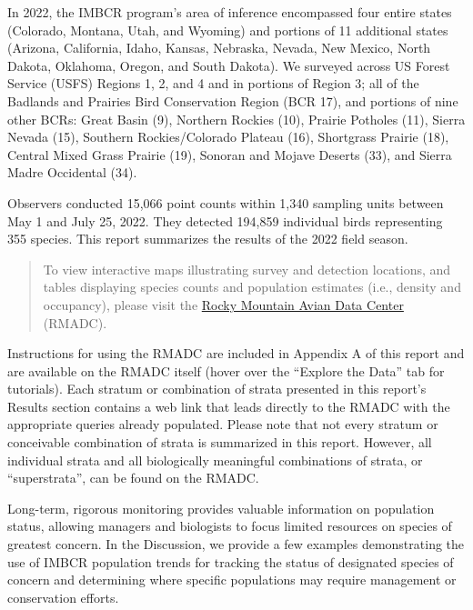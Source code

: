 \documentclass[
  letterpaper,
  DIV=11,
  numbers=noendperiod,
  oneside]{scrreprt}
\begin{document}
In 2022, the IMBCR program's area of inference encompassed four entire
states (Colorado, Montana, Utah, and Wyoming) and portions of 11
additional states (Arizona, California, Idaho, Kansas, Nebraska, Nevada,
New Mexico, North Dakota, Oklahoma, Oregon, and South Dakota). We
surveyed across US Forest Service (USFS) Regions 1, 2, and 4 and in
portions of Region 3; all of the Badlands and Prairies Bird Conservation
Region (BCR 17), and portions of nine other BCRs: Great Basin (9),
Northern Rockies (10), Prairie Potholes (11), Sierra Nevada (15),
Southern Rockies/Colorado Plateau (16), Shortgrass Prairie (18), Central
Mixed Grass Prairie (19), Sonoran and Mojave Deserts (33), and Sierra
Madre Occidental (34).

Observers conducted 15,066 point counts within 1,340 sampling units
between May 1 and July 25, 2022. They detected 194,859 individual birds
representing 355 species. This report summarizes the results of the 2022
field season.

\begin{quote}
To view interactive maps illustrating survey and detection locations,
and tables displaying species counts and population estimates (i.e.,
density and occupancy), please visit the
\href{http://rmbo.org/v3/avian/ExploretheData.aspx}{Rocky Mountain Avian
Data Center} (RMADC).
\end{quote}

\begin{tcolorbox}[enhanced jigsaw, breakable, colframe=quarto-callout-note-color-frame, toprule=.15mm, leftrule=.75mm, bottomrule=.15mm, rightrule=.15mm, left=2mm, arc=.35mm, colback=white, opacityback=0]

Instructions for using the RMADC are included in Appendix A of this
report and are available on the RMADC itself (hover over the ``Explore
the Data'' tab for tutorials). Each stratum or combination of strata
presented in this report's Results section contains a web link that
leads directly to the RMADC with the appropriate queries already
populated. Please note that not every stratum or conceivable combination
of strata is summarized in this report. However, all individual strata
and all biologically meaningful combinations of strata, or
``superstrata'', can be found on the RMADC.

\end{tcolorbox}

Long-term, rigorous monitoring provides valuable information on
population status, allowing managers and biologists to focus limited
resources on species of greatest concern. In the Discussion, we provide
a few examples demonstrating the use of IMBCR population trends for
tracking the status of designated species of concern and determining
where specific populations may require management or conservation
efforts.
\end{document}
